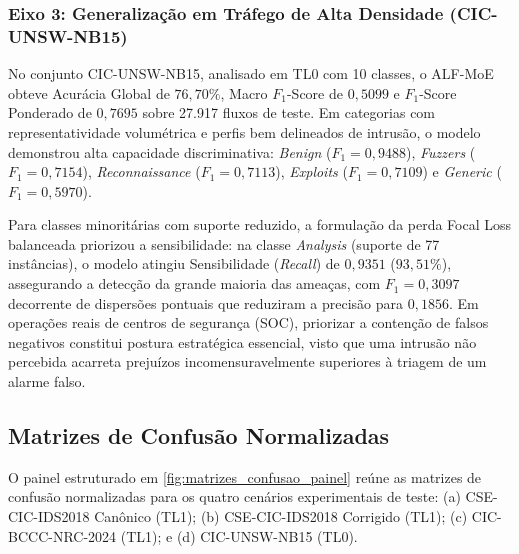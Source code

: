 \subsubsection{Eixo 3: Generalização em Tráfego de Alta Densidade (CIC-UNSW-NB15)}

No conjunto CIC-UNSW-NB15, analisado em TL0 com 10 classes, o ALF-MoE obteve Acurácia Global de
$76{,}70\%$, Macro $F_1$-Score de $0{,}5099$ e $F_1$-Score Ponderado de $0{,}7695$ sobre 27.917 fluxos
de teste. Em categorias com representatividade volumétrica e perfis bem delineados de intrusão, o
modelo demonstrou alta capacidade discriminativa: \emph{Benign} ($F_1 = 0{,}9488$), \emph{Fuzzers}
($F_1 = 0{,}7154$), \emph{Reconnaissance} ($F_1 = 0{,}7113$), \emph{Exploits} ($F_1 = 0{,}7109$) e
\emph{Generic} ($F_1 = 0{,}5970$).

Para classes minoritárias com suporte reduzido, a formulação da perda Focal Loss balanceada priorizou
a sensibilidade: na classe \emph{Analysis} (suporte de 77 instâncias), o modelo atingiu Sensibilidade
(\emph{Recall}) de $0{,}9351$ ($93{,}51\%$), assegurando a detecção da grande maioria das ameaças,
com $F_1 = 0{,}3097$ decorrente de dispersões pontuais que reduziram a precisão para $0{,}1856$. Em
operações reais de centros de segurança (SOC), priorizar a contenção de falsos negativos constitui
postura estratégica essencial, visto que uma intrusão não percebida acarreta prejuízos incomensuravelmente
superiores à triagem de um alarme falso.

\subsection{Matrizes de Confusão Normalizadas}
\label{subsec:matrizes_confusao}

O painel estruturado em \ref{fig:matrizes_confusao_painel} reúne as matrizes de confusão normalizadas
para os quatro cenários experimentais de teste: (a) CSE-CIC-IDS2018 Canônico (TL1); (b)
CSE-CIC-IDS2018 Corrigido (TL1); (c) CIC-BCCC-NRC-2024 (TL1); e (d) CIC-UNSW-NB15 (TL0).

